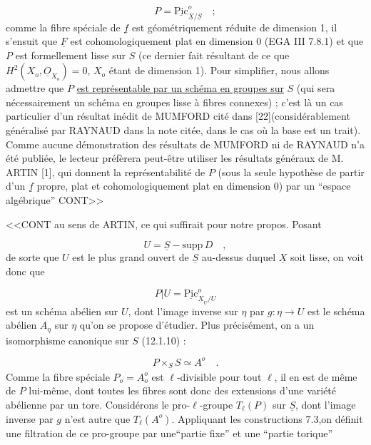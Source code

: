 \begin{equation}\tag{12.8.3}
P = \underline{\mathrm{Pic}}^{o}_{\underline{X}/\underline{S}} \quad ;
\end{equation}
comme la fibre spéciale de $\underline{f}$ est géométriquement réduite de dimension 1, il s'ensuit que $\underline{F}$ est cohomologiquement plat en dimension 0 (EGA III 7.8.1) et que $P$ est formellement lisse sur $S$ (ce dernier fait résultant de ce que $H^2(X_o,\underline{O}_{X_o}) = 0$, $X_o$ étant de dimension 1). Pour simplifier, nous allons admettre que $P$ \underline{est représentable par un schéma en groupes sur} $S$ (qui sera nécessairement un schéma en groupes lisse à fibres connexes) ; c'est là un cas particulier d'un résultat inédit de MUMFORD cité dans [22](considérablement généralisé par RAYNAUD dans la note citée, dans le cas où la base est un trait). Comme aucune démonstration des résultats de MUMFORD ni de RAYNAUD n'a été publiée, le lecteur préfèrera peut-être utiliser les résultats généraux de M. ARTIN [1], qui donnent la représentabilité de $P$ (sous la seule hypothèse de partir d'un $\underline{f}$ propre, plat et cohomologiquement plat en dimension 0) par un ``espace algébrique'' CONT>>



<<CONT au sens de ARTIN, ce qui suffirait pour notre propos. Posant

\begin{equation}\tag{12.8.4}
U = \underline{S} - \mathrm{supp}\, D \quad ,
\end{equation}
de sorte que $U$ est le plus grand ouvert de $\underline{S}$ au-dessus duquel $\underline{X}$ soit lisse, on voit donc que

\begin{equation*}
P\vert U = \underline{\mathrm{Pic}}^{o}_{\underline{X}_U/U}
\end{equation*}
est un schéma abélien sur $U$, dont l'image inverse sur $\eta$ par $g : \eta \longrightarrow U$ est le schéma abélien $A_\eta$ sur $\eta$ qu'on se propose d'étudier. Plus précisément, on a un isomorphisme canonique sur $S$ (12.1.10) :

\begin{equation}\tag{12.8.5}
P \times_{\underline{S}} S \simeq A^{o} \quad .
\end{equation}
Comme la fibre spéciale $P_o = A_o^{o}$ est $\ell$-divisible pour tout $\ell$, il en est de même de $P$ lui-même, dont toutes les fibres sont donc des extensions d'une variété abélienne par un tore. Considérons le pro-$\ell$-groupe $T_\ell(P)$ sur $\underline{S}$, dont l'image inverse par $g$ n'est autre que $T_\ell(A^{o})$. Appliquant les constructions 7.3,on définit une filtration de ce pro-groupe par une``partie fixe'' et une ``partie torique''

